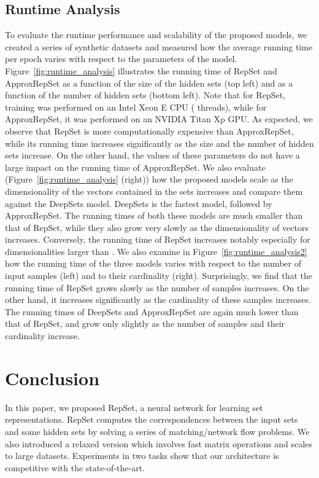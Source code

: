 \documentclass[twoside]{article}
\begin{document}
\subsection{Runtime Analysis}
To evaluate the runtime performance and scalability of the proposed models, we created a series of synthetic datasets and measured how the average running time per epoch varies with respect to the parameters of the model.
Figure~\ref{fig:runtime_analysis} illustrates the running time of RepSet and ApproxRepSet as a function of the size of the hidden sets  (top left) and as a function of the number of hidden sets  (bottom left). 
Note that for RepSet, training was performed on an Intel Xeon E CPU ( threads), while for ApproxRepSet, it was performed on an NVIDIA Titan Xp GPU.
As expected, we observe that RepSet is more computationally expensive than ApproxRepSet, while its running time increases significantly as the size and the number of hidden sets increase.
On the other hand, the values of these parameters do not have a large impact on the running time of ApproxRepSet.
We also evaluate (Figure~\ref{fig:runtime_analysis} (right)) how the proposed models scale as the dimensionality of the vectors contained in the sets increases and compare them against the DeepSets model.
DeepSets is the fastest model, followed by ApproxRepSet.
The running times of both these models are much smaller than that of RepSet, while they also grow very slowly as the dimensionality of vectors increases.
Conversely, the running time of RepSet increases notably especially for dimensionalities larger than .
We also examine in Figure~\ref{fig:runtime_analysis2} how the running time of the three models varies with respect to the number of input samples  (left) and to their cardinality  (right).
Surprisingly, we find that the running time of RepSet grows slowly as the number of samples increases.
On the other hand, it increases significantly as the cardinality of these samples increases.
The running times of DeepSets and ApproxRepSet are again much lower than that of RepSet, and grow only slightly as the number of samples and their cardinality increase.

\section{Conclusion}\label{sec:conclusion}
In this paper, we proposed RepSet, a neural network for learning set representations.
RepSet computes the correspondences between the input sets and some hidden sets by solving a series of matching/network flow problems.
We also introduced a relaxed version which involves fast matrix operations and scales to large datasets.
Experiments in two tasks show that our architecture is competitive with the state-of-the-art.
\end{document}
